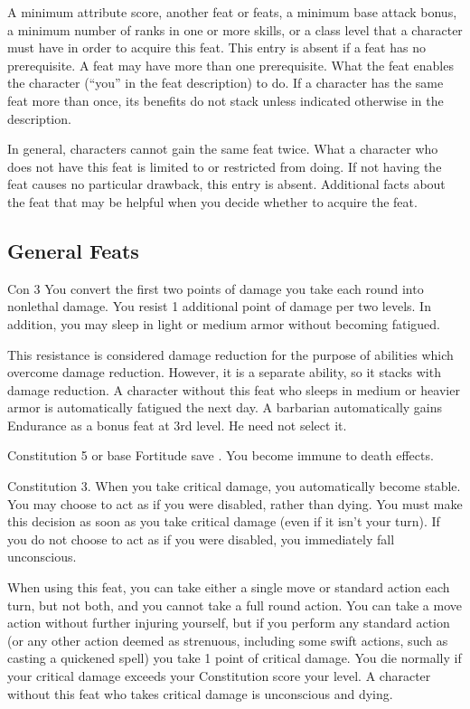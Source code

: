  A minimum attribute score, another feat or feats, a minimum base attack bonus, a minimum number of ranks in one or more skills, or a class level that a character must have in order to acquire this feat. This entry is absent if a feat has no prerequisite. A feat may have more than one prerequisite.
 What the feat enables the character (``you'' in the feat description) to do. If a character has the same feat more than once, its benefits do not stack unless indicated otherwise in the description.
\par In general, characters cannot gain the same feat twice.
 What a character who does not have this feat is limited to or restricted from doing. If not having the feat causes no particular drawback, this entry is absent.
 Additional facts about the feat that may be helpful when you decide whether to acquire the feat.

\subsection{General Feats}

\featpre Con 3
 You convert the first two points of damage you take each round into nonlethal damage. You resist 1 additional point of damage per two levels. In addition, you may sleep in light or medium armor without becoming fatigued.

This resistance is considered damage reduction for the purpose of abilities which overcome damage reduction. However, it is a separate ability, so it stacks with damage reduction.
 A character without this feat who sleeps in medium or heavier armor is automatically fatigued the next day.
 A barbarian automatically gains Endurance as a bonus feat at 3rd level. He need not select it.

\featpre Constitution 5 or base Fortitude save .
\featben You become immune to death effects.

 Constitution 3.
 When you take critical damage, you automatically become stable. You may choose to act as if you were disabled, rather than dying. You must make this decision as soon as you take critical damage (even if it isn't your turn). If you do not choose to act as if you were disabled, you immediately fall unconscious.
\par When using this feat, you can take either a single move or standard action each turn, but not both, and you cannot take a full round action. You can take a move action without further injuring yourself, but if you perform any standard action (or any other action deemed as strenuous, including some swift actions, such as casting a quickened spell) you take 1 point of critical damage. You die normally if your critical damage exceeds your Constitution score \add your level.
 A character without this feat who takes critical damage is unconscious and dying.

